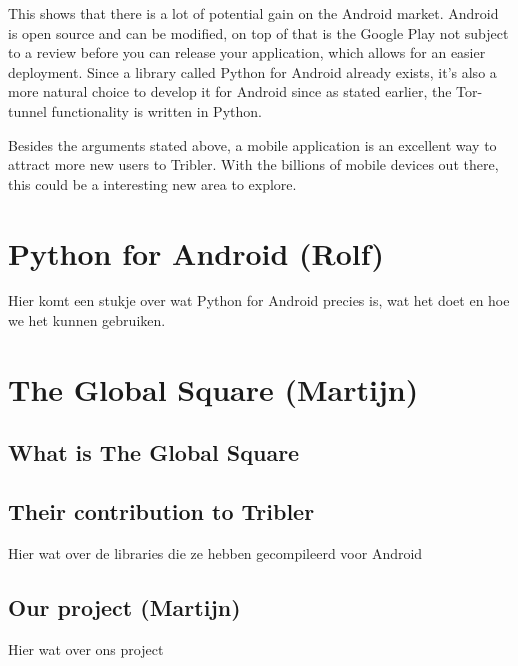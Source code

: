 \documentclass[11pt]{article}
\begin{document}
This shows that there is a lot of potential gain on the Android market. Android is open source and can be modified, on top of that is the Google Play not subject to a review before you can release your application, which allows for an easier deployment. Since a library called Python for Android already exists, it's also a more natural choice to develop it for Android since as stated earlier, the Tor-tunnel functionality is written in Python.

Besides the arguments stated above, a mobile application is an excellent way to attract more new users to Tribler. With the billions of mobile devices out there, this could be a interesting new area to explore.

\section{Python for Android (Rolf)}
Hier komt een stukje over wat Python for Android precies is, wat het doet en hoe we het kunnen gebruiken.

\section{The Global Square (Martijn)}

\subsection{What is The Global Square}

\subsection{Their contribution to Tribler}
Hier wat over de libraries die ze hebben gecompileerd voor Android

\subsection{Our project (Martijn)}
Hier wat over ons project
\end{document}
